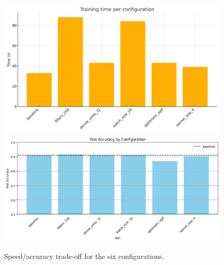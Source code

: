 \documentclass[12pt]{article}
\begin{document}
\begin{figure}[ht]
  \centering
    {\includegraphics[width=.48\linewidth]{time_chart.png}}
  \hfill
    {\includegraphics[width=.48\linewidth]{test-accuracy.png}}
  \caption{Speed/accuracy trade-off for the six configurations.}
  \label{fig:tradeoff}
\end{figure}
\FloatBarrier
\end{document}
